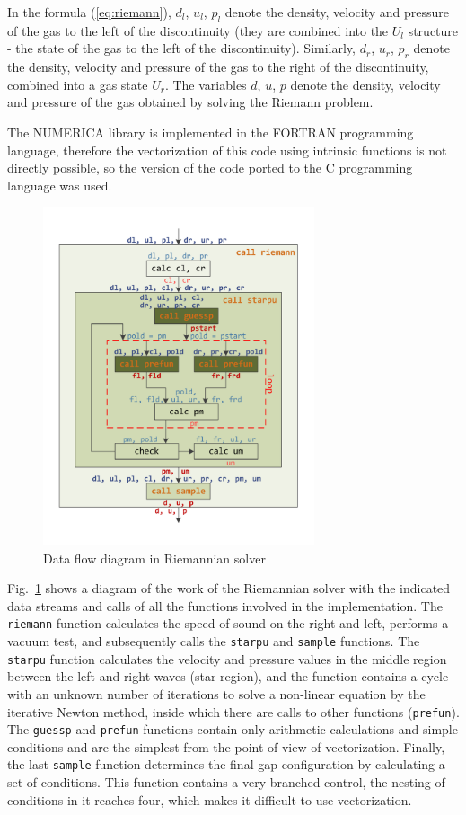 \documentclass[utf8,english]{psta}%
\begin{document}
In the formula (\ref{eq:riemann}), $d_l$, $u_l$, $p_l$ denote the density, velocity and pressure of the gas to the left of the discontinuity (they are combined into the $U_l$ structure - the state of the gas to the left of the discontinuity).
Similarly, $d_r$, $u_r$, $p_r$ denote the density, velocity and pressure of the gas to the right of the discontinuity, combined into a gas state $U_r$.
The variables $d$, $u$, $p$ denote the density, velocity and pressure of the gas obtained by solving the Riemann problem.

The NUMERICA library is implemented in the FORTRAN programming language, therefore the vectorization of this code using intrinsic functions is not directly possible, so the version of the code ported to the C programming language was used.

\begin{figure}
\includegraphics[width=8cm]{pics/pic_functions}
\caption{Data flow diagram in Riemannian solver}
\label{pic:functions}
\end{figure}

Fig.~\ref{pic:functions} shows a diagram of the work of the Riemannian solver with the indicated data streams and calls of all the functions involved in the implementation. The \texttt{riemann} function calculates the speed of sound on the right and left, performs a vacuum test, and subsequently calls the \texttt{starpu} and \texttt{sample} functions.
The \texttt{starpu} function calculates the velocity and pressure values in the middle region between the left and right waves (star region), and the function contains a cycle with an unknown number of iterations to solve a non-linear equation by the iterative Newton method, inside which there are calls to other functions (\texttt{prefun}).
The \texttt{guessp} and \texttt{prefun} functions contain only arithmetic calculations and simple conditions and are the simplest from the point of view of vectorization.
Finally, the last \texttt{sample} function determines the final gap configuration by calculating a set of conditions.
This function contains a very branched control, the nesting of conditions in it reaches four, which makes it difficult to use vectorization.
\end{document}
